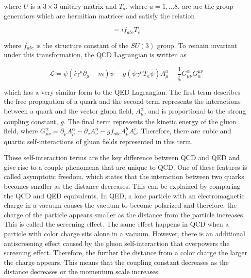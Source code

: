 \noindent
where $U$ is a $3\times3$ unitary matrix and $T_{a}$, where $a=1,...8$, are are the group generators which are hermitian matrices and satisfy the relation

\begin{equation}
[T_{a},T_{b}] = if_{abc}T_{c}
\end{equation}

\noindent
where $f_{abc}$ is the structure constant of the $SU(3)$ group. To remain invariant under this transformation, the QCD Lagrangian is written as


\begin{equation}
\mathcal{L}= \bar{\psi}(i\gamma^{\mu}\partial_{\mu} - m)\psi - g(\bar{\psi}\gamma^{\mu}T_{a}\psi)A^{a}_{\mu} - \frac{1}{4}G^{\alpha}_{\mu\nu}G^{\mu\nu}_{\alpha}
\end{equation}
 
\noindent
which has a very similar form to the QED Lagrangian. The first term describes the free propagation of a quark and the second term represents the interactions between a quark and the vector gluon field, $A^{\alpha}_{\mu}$, and is proportional to the strong coupling constant, $g$. The final term represents the kinetic energy of the gluon field, where $G^{\alpha}_{\mu\nu}=\partial_{\mu}A^{\alpha}_{\mu} - \partial_{\nu}A^{\alpha}_{\nu} - gf_{abc}A^{b}_{\mu}A^{c}_{\nu}$. Therefore, there are cubic and quartic self-interactions of gluon fields represented in this term.

These self-interaction terms are the key difference between QCD and QED and give rise to a couple phenomena that are unique to QCD. One of these features is called asymptotic freedom, which states that the interaction between two quarks becomes smaller as the distance decreases. This can be explained by comparing the QCD and QED equivalents. In QED, a lone particle with an electromagnetic charge in a vacuum causes the vacuum to become polarized and therefore, the charge of the particle appears smaller as the distance from the particle increases. This is called the screening effect. The same effect happens in QCD when a particle with color charge sits alone in a vacuum. However, there is an additional antiscreening effect caused by the gluon self-interaction that overpowers the screening effect. Therefore, the further the distance from a color charge the larger the charge appears. This means that the coupling constant decreases as the distance decreases or the momentum scale increases.

